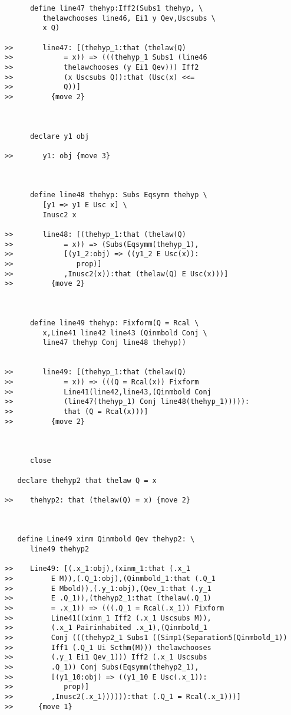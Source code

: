 \documentclass[12pt]{article}
\begin{document}
\begin{verbatim}
      define line47 thehyp:Iff2(Subs1 thehyp, \
         thelawchooses line46, Ei1 y Qev,Uscsubs \
         x Q)

>>       line47: [(thehyp_1:that (thelaw(Q)
>>            = x)) => (((thehyp_1 Subs1 (line46
>>            thelawchooses (y Ei1 Qev))) Iff2
>>            (x Uscsubs Q)):that (Usc(x) <<=
>>            Q))]
>>         {move 2}



      declare y1 obj

>>       y1: obj {move 3}



      define line48 thehyp: Subs Eqsymm thehyp \
         [y1 => y1 E Usc x] \
         Inusc2 x

>>       line48: [(thehyp_1:that (thelaw(Q)
>>            = x)) => (Subs(Eqsymm(thehyp_1),
>>            [(y1_2:obj) => ((y1_2 E Usc(x)):
>>               prop)]
>>            ,Inusc2(x)):that (thelaw(Q) E Usc(x)))]
>>         {move 2}



      define line49 thehyp: Fixform(Q = Rcal \
         x,Line41 line42 line43 (Qinmbold Conj \
         line47 thehyp Conj line48 thehyp))


>>       line49: [(thehyp_1:that (thelaw(Q)
>>            = x)) => (((Q = Rcal(x)) Fixform
>>            Line41(line42,line43,(Qinmbold Conj
>>            (line47(thehyp_1) Conj line48(thehyp_1))))):
>>            that (Q = Rcal(x)))]
>>         {move 2}



      close

   declare thehyp2 that thelaw Q = x

>>    thehyp2: that (thelaw(Q) = x) {move 2}



   define Line49 xinm Qinmbold Qev thehyp2: \
      line49 thehyp2

>>    Line49: [(.x_1:obj),(xinm_1:that (.x_1
>>         E M)),(.Q_1:obj),(Qinmbold_1:that (.Q_1
>>         E Mbold)),(.y_1:obj),(Qev_1:that (.y_1
>>         E .Q_1)),(thehyp2_1:that (thelaw(.Q_1)
>>         = .x_1)) => (((.Q_1 = Rcal(.x_1)) Fixform
>>         Line41((xinm_1 Iff2 (.x_1 Uscsubs M)),
>>         (.x_1 Pairinhabited .x_1),(Qinmbold_1
>>         Conj (((thehyp2_1 Subs1 ((Simp1(Separation5(Qinmbold_1))
>>         Iff1 (.Q_1 Ui Scthm(M))) thelawchooses
>>         (.y_1 Ei1 Qev_1))) Iff2 (.x_1 Uscsubs
>>         .Q_1)) Conj Subs(Eqsymm(thehyp2_1),
>>         [(y1_10:obj) => ((y1_10 E Usc(.x_1)):
>>            prop)]
>>         ,Inusc2(.x_1)))))):that (.Q_1 = Rcal(.x_1)))]
>>      {move 1}




\end{verbatim}
\end{document}
